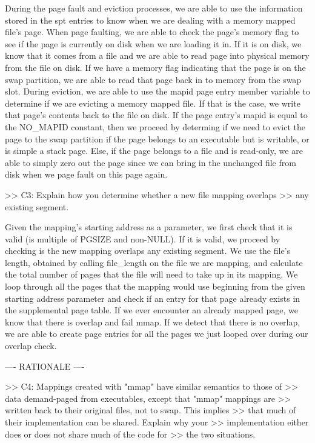 During the page fault and eviction processes, we are able to use the
information stored in the spt entries to know when we are dealing with
a memory mapped file's page. When page faulting, we are able to check the
page's memory flag to see if the page is currently on disk when we are
loading it in. If it is on disk, we know that it comes from a file and we
are able to read page into physical memory from the file on disk. If we
have a memory flag indicating that the page is on the swap partition, we
are able to read that page back in to memory from the swap slot. During 
eviction, we are able to use the mapid page entry member variable to
determine if we are evicting a memory mapped file. If that is the case,
we write that page's contents back to the file on disk. If the page entry's
mapid is equal to the NO_MAPID constant, then we proceed by determing if
we need to evict the page to the swap partition if the page belongs to an
executable but is writable, or is simple a stack page. Else, if the page
belongs to a file and is read-only, we are able to simply zero out the page
since we can bring in the unchanged file from disk when we page fault on
this page again.

>> C3: Explain how you determine whether a new file mapping overlaps
>> any existing segment.

Given the mapping's starting address as a parameter, we first check that it
is valid (is multiple of PGSIZE and non-NULL). If it is valid, we proceed by
checking is the new mapping overlaps any existing segment. We use the file's 
length, obtained by calling file_length on the file we are mapping, and
calculate the total number of pages that the file will need to take up in its 
mapping. We loop through all the pages that the mapping would use beginning
from the given starting address parameter and check if
an entry for that page already exists in the supplemental page table. If we
ever encounter an already mapped page, we know that there is overlap and
fail mmap. If we detect that there is no overlap, we are able to create page
entries for all the pages we just looped over during our overlap check.

---- RATIONALE ----

>> C4: Mappings created with "mmap" have similar semantics to those of
>> data demand-paged from executables, except that "mmap" mappings are
>> written back to their original files, not to swap.  This implies
>> that much of their implementation can be shared.  Explain why your
>> implementation either does or does not share much of the code for
>> the two situations.

